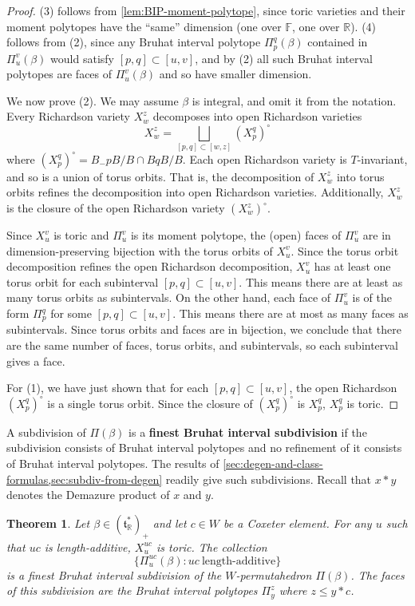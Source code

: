 \documentclass[10pt,a4paper]{amsart}
\newtheorem{theorem}[Thm]{Theorem}
\newcommand{\RR}{\mathbb{R}}
\newcommand\defn[1]{{\bf #1}}
\def\pt{\beta}
\def\BB{{(\lie{t}_\RR^*)_+}}
\newcommand\lie[1]{{\mathfrak #1}}
\newcommand\FF{{\mathbb F}}
\begin{document}
\begin{proof}
  (3) follows from \cref{lem:BIP-moment-polytope}, since toric
  varieties and their moment polytopes have the ``same'' dimension
  (one over $\FF$, one over $\RR$). (4)
  follows from (2), since any Bruhat interval polytope $\Pi_p^q(\pt)$
  contained in $\Pi_u^v(\pt)$ would satisfy $[p, q] \subset [u,v]$,
  and by (2) all such Bruhat interval polytopes are faces of
  $\Pi_u^v(\pt)$ and so have smaller dimension.
	
	We now prove (2). We may assume $\pt$ is integral, and omit it from the notation. Every Richardson variety $X_w^z$ decomposes into open Richardson varieties
	\[X_w^z = \bigsqcup_{[p,q] \subset [w,z]} ({X}_p^q)^\circ\]
	where $({X}_p^q)^\circ = B_-p B/B \cap B q B /B$.
	Each open Richardson variety is $T$-invariant, and so is a union of torus orbits. That is, the decomposition of $X_w^z$ into torus orbits refines the decomposition into open Richardson varieties. Additionally, $X_w^z$ is the closure of the open Richardson variety $({X}_w^z)^\circ$.
	
	Since $X_u^v$ is toric and $\Pi_u^v$ is its moment polytope, the (open) faces of $\Pi_u^v$ are in dimension-preserving bijection with the torus orbits of $X_u^v$. Since the torus orbit decomposition refines the open Richardson decomposition, $X_u^v$ has at least one torus orbit for each subinterval $[p, q] \subset [u,v]$. This means there are at least as many torus orbits as subintervals. On the other hand, each face of $\Pi_u^v$ is of the form $\Pi_p^q$ for some $[p,q] \subset [u,v]$. This means there are at most as many faces as subintervals. Since torus orbits and faces are in bijection, we conclude that there are the same number of faces, torus orbits, and subintervals, so each subinterval gives a face.
	
	For (1), we have just shown that for each $[p,q] \subset [u,v]$, the open Richardson $(X_p^q)^\circ$ is a single torus orbit. Since the closure of $(X_p^q)^\circ$ is $X_p^q$, $X_p^q$ is toric.
\end{proof}

A subdivision of $\Pi(\pt)$ is a \defn{finest Bruhat interval subdivision} if the subdivision consists of Bruhat interval polytopes and no refinement of it consists of Bruhat interval polytopes. The results of \cref{sec:degen-and-class-formulas,sec:subdiv-from-degen} readily give such subdivisions. Recall that $x * y$ denotes the Demazure product of $x$ and $y$.

\begin{theorem}\label{thm:subdivision-Coxeter}
  Let $\pt \in \BB$ and let $c \in W$ be a Coxeter element. For any
  $u$ such that $uc$ is length-additive, $X_u^{uc}$ is toric. The
  collection \begin{equation}\label{eq:BIP-in-subdiv} \{\Pi_u^{uc}(\pt): uc~\text{length-additive}\} \end{equation} is a
  finest Bruhat interval subdivision of the $W$-permutahedron
  $\Pi(\pt)$. The faces of this subdivision are the Bruhat interval
  polytopes $\Pi_y^z$ where $z \leq y * c$.
\end{theorem}
\end{document}
